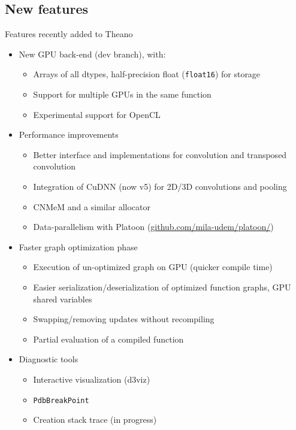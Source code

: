 \documentclass[a4paper,9pt]{beamer}
\begin{document}
\subsection{New features}
\begin{frame}[fragile]{Features recently added to Theano}
  \begin{itemize}
    \item New GPU back-end (dev branch), with:
      \begin{itemize}
        \item Arrays of all dtypes, half-precision float (\verb|float16|) for storage
        \item Support for multiple GPUs in the same function
        \item Experimental support for OpenCL
      \end{itemize}
    \item Performance improvements
      \begin{itemize}
        \item Better interface and implementations for convolution and transposed convolution
        \item Integration of CuDNN (now v5) for 2D/3D convolutions and pooling
        \item CNMeM and a similar allocator
        \item Data-parallelism with Platoon (\url{github.com/mila-udem/platoon/})
      \end{itemize}
    \item Faster graph optimization phase
      \begin{itemize}
        \item Execution of un-optimized graph on GPU (quicker compile time)
        \item Easier serialization/deserialization of optimized function graphs, GPU shared variables
        \item Swapping/removing updates without recompiling
        \item Partial evaluation of a compiled function
      \end{itemize}
    \item Diagnostic tools
      \begin{itemize}
        \item Interactive visualization (d3viz)
        \item \verb|PdbBreakPoint|
        \item Creation stack trace (in progress)
      \end{itemize}
  \end{itemize}
\end{frame}
\end{document}
